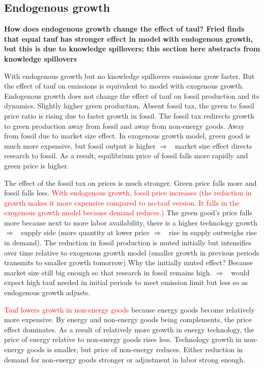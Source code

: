 \documentclass[12pt]{article}
\newcommand{\ar}{$\Rightarrow$ \ }
\newcommand{\tr}[1]{\textcolor{red}{#1}}
\begin{document}
\subsection{Endogenous growth}
\textbf{How does endogenous growth change the effect of taul? Fried finds that equal tauf has stronger effect in model with endogenous growth, but this is due to knowledge spillovers; this section here abstracts from knowledge spillovers}

With endogenous growth but no knowledge spillovers emissions grow faster. But the effect of tauf on emissions is equivalent to model with exogenous growth. Endogenous growth does not change the effect of tauf on fossil production and its dynamics. Slightly higher green production. Absent fossil tax, the green to fossil price ratio is rising due to faster growth in fossil. The fossil tax redirects growth to green production away from fossil and away from non-energy goods. Away from fossil due to market size effect. In exogenous growth model, green good is much more expensive, but fossil output is higher \ar market size effect directs research to fossil. 
As a result, equilibrium price of fossil falls more rapidly and green price is higher. 

The effect of the fossil tax on prices is much stronger. Green price falls more and fossil falls less. \tr{With endogenous growth, fossil price increases (the reduction in growth makes it more expensive compared to no-tauf version. It falls in the exogenous growth model because demand reduces.)} The green good's price falls more because next to more labor availability, there is a higher technology growth \ar supply side (more quantity at lower price \ar rise in supply outweighs rise in demand).  The reduction in fossil production is muted initially but intensifies over time relative to exogenous growth model (smaller growth in previous periods transmits to smaller growth tomorrow) Why the initially muted effect? Because market size still big enough so that research in fossil remains high. \ar would expect high tauf needed in initial periods to meet emission limit but less so as endogenous growth adjusts. 

\tr{Tauf lowers growth in non-energy goods} because energy goods become relatively more expensive. By energy and non-energy goods being complements, the price effect dominates. As a result of relatively more growth in energy technology, the price of energy relative to non-energy goods rises less. 
Technology growth in non-energy goods is smaller, but price of non-energy reduces. Either reduction in demand for non-energy goods stronger or adjustment in labor strong enough. 
\end{document}
